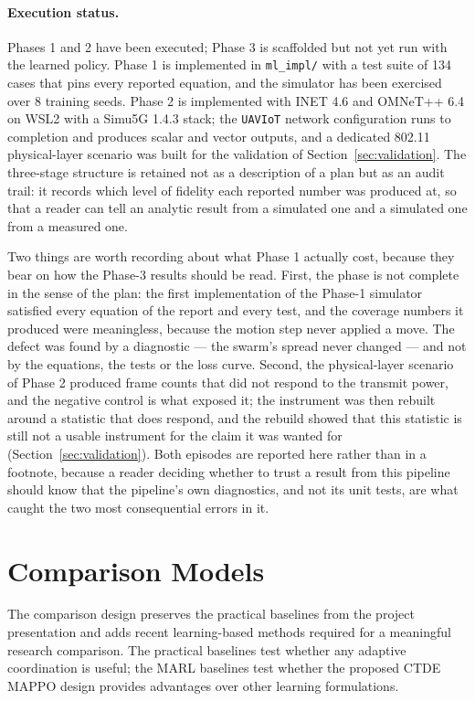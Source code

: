 \documentclass[conference]{IEEEtran}
\newcommand{\tokMappoNSeeds}{8}
\newcommand{\tokNTests}{134}
\begin{document}
\paragraph{Execution status.}
Phases 1 and 2 have been executed; Phase 3 is scaffolded but not yet run with the learned policy. Phase 1 is implemented in \texttt{ml\_impl/} with a test suite of \tokNTests{} cases that pins every reported equation, and the simulator has been exercised over \tokMappoNSeeds{} training seeds. Phase 2 is implemented with INET 4.6 and OMNeT++ 6.4 on WSL2 with a Simu5G 1.4.3 stack; the \texttt{UAVIoT} network configuration runs to completion and produces scalar and vector outputs, and a dedicated 802.11 physical-layer scenario was built for the validation of Section~\ref{sec:validation}. The three-stage structure is retained not as a description of a plan but as an audit trail: it records which level of fidelity each reported number was produced at, so that a reader can tell an analytic result from a simulated one and a simulated one from a measured one.

Two things are worth recording about what Phase 1 actually cost, because they bear on how the Phase-3 results should be read. First, the phase is not complete in the sense of the plan: the first implementation of the Phase-1 simulator satisfied every equation of the report and every test, and the coverage numbers it produced were meaningless, because the motion step never applied a move. The defect was found by a diagnostic --- the swarm's spread never changed --- and not by the equations, the tests or the loss curve. Second, the physical-layer scenario of Phase 2 produced frame counts that did not respond to the transmit power, and the negative control is what exposed it; the instrument was then rebuilt around a statistic that does respond, and the rebuild showed that this statistic is still not a usable instrument for the claim it was wanted for (Section~\ref{sec:validation}). Both episodes are reported here rather than in a footnote, because a reader deciding whether to trust a result from this pipeline should know that the pipeline's own diagnostics, and not its unit tests, are what caught the two most consequential errors in it.


\section{Comparison Models}
\label{sec:comparison}
The comparison design preserves the practical baselines from the project presentation and adds recent learning-based methods required for a meaningful research comparison. The practical baselines test whether any adaptive coordination is useful; the MARL baselines test whether the proposed CTDE MAPPO design provides advantages over other learning formulations.
\end{document}
